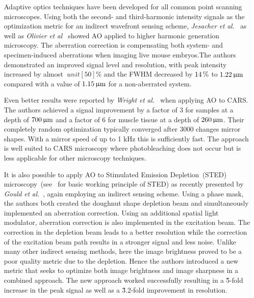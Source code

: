 Adaptive optics techniques have been developed for all common point scanning microscopes. Using both the second- and third-harmonic intensity signals as the optimization metric for an indirect wavefront sensing scheme, \emph{Jesacher et al.}~\cite{scan_HG_dynamic} as well as \emph{Olivier et al}~\cite{scan_HG_embryos} showed AO applied to higher harmonic generation microscopy. The aberration correction is compensating both system- and specimen-induced aberrations when imaging live mouse embryos.The authors demonstrated an improved signal level and resolution, with peak intensity increased by almost $\ unit[50]{\%}$ and the FWHM decreased by $\unit[14]{\%}$ to  $\unit[1.22]{\upmu m}$ compared with a value of $\unit[1.15]{\upmu m}$ for a non-aberrated system.

Even better results were reported by \emph{Wright et al.}~\cite{scan_CARS} when applying AO to CARS. The authors achieved a signal improvement by a factor of 3 for samples at a depth of $\unit[700]{\upmu m}$ and a factor of 6 for muscle tissue at a depth of $\unit[260]{\upmu m}$. Their completely random optimization typically converged after 3000 changes mirror shapes. With a mirror speed of up to 1 kHz this is sufficiently fast. The approach is well suited to CARS microscopy where photobleaching does not occur but is less applicable for other microscopy techniques. 

It is also possible to apply AO to Stimulated Emission Depletion~(STED) microscopy~(see~\cite{scan_STED_principle} for basic working principle of STED) as recently presented by \emph{Gould et al.}~\cite{scan_STED}, again employing an indirect sensing scheme. Using a phase mask, the authors both created the doughnut shape depletion beam and simultaneously implemented an aberration correction. Using an additional spatial light modulator, aberration correction is also implemented in the excitation beam. The correction in the depletion beam leads to a better resolution while the correction of the excitation beam path results in a stronger signal and less noise. Unlike many other indirect sensing methods, here the image brightness proved to be a poor quality metric due to the depletion. Hence the authors introduced a new metric that seeks to optimize both image brightness and image sharpness in a combined approach. The new approach worked successfully resulting in a \~5-fold increase in the peak signal as well as a \~3.2-fold improvement in resolution.

